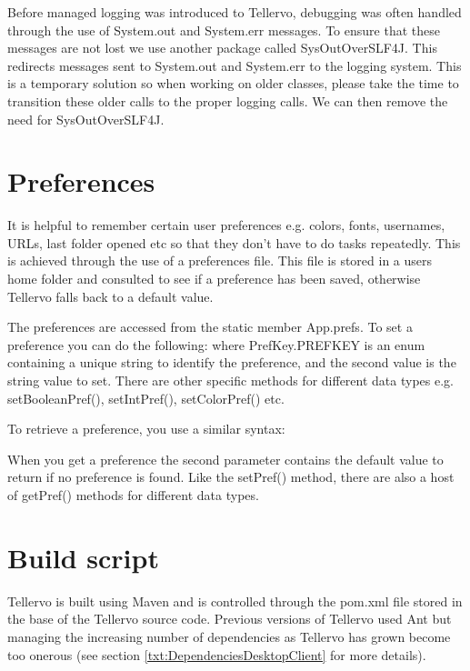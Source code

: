 Before managed logging was introduced to Tellervo, debugging was often handled through the use of System.out and System.err messages.  To ensure that these messages are not lost we use another package called SysOutOverSLF4J.  This redirects messages sent to System.out and System.err to the logging system.  This is a temporary solution so when working on older classes, please take the time to transition these older calls to the proper logging calls.  We can then remove the need for SysOutOverSLF4J.


\section{Preferences}
It is helpful to remember certain user preferences e.g. colors, fonts, usernames, URLs, last folder opened etc so that they don't have to do tasks repeatedly.  This is achieved through the use of a preferences file.  This file is stored in a users home folder and consulted to see if a preference has been saved, otherwise Tellervo falls back to a default value.  

The preferences are accessed from the static member App.prefs.  To set a preference you can do the following:
where PrefKey.PREFKEY is an enum containing a unique string to identify the preference, and the second value is the string value to set.  There are other specific methods for different data types e.g. setBooleanPref(), setIntPref(), setColorPref() etc.

To retrieve a preference, you use a similar syntax:

When you get a preference the second parameter contains the default value to return if no preference is found.  Like the setPref() method, there are also a host of getPref() methods for different data types.



\section{Build script}
\label{txt:buildScript}
Tellervo is built using Maven and is controlled through the pom.xml file stored in the base of the Tellervo source code.  Previous versions of Tellervo used Ant but managing the increasing number of dependencies as Tellervo has grown become too onerous (see section \ref{txt:DependenciesDesktopClient} for more details). 

